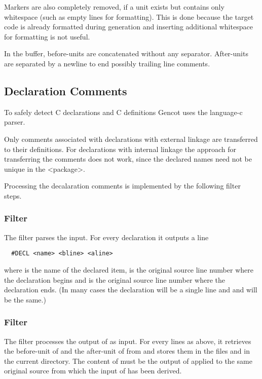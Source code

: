 Markers are also completely removed, if a unit exists but contains only whitespace (such as empty lines for
formatting). This is done because the target code is already formatted during generation and inserting additional
whitespace for formatting is not useful.

In the buffer, before-units are concatenated without any separator. After-units are separated by a newline to end possibly 
trailing line comments.





\subsection{Declaration Comments}

To safely detect C declarations and C definitions Gencot uses the language-c parser. 

Only comments associated with declarations with external linkage are transferred to their definitions. For declarations
with internal linkage the approach for transferring the comments does not work, since the declared names need not be
unique in the <package>.

Processing the decalaration comments is implemented by the following filter steps. 

\subsubsection{Filter }

The filter  parses the input. For every declaration it outputs a line
\begin{verbatim}
  #DECL <name> <bline> <aline>
\end{verbatim}
where  is the name of the declared item,  is the original source line 
number where the declaration begins and  is
the original source line number where the declaration ends. (In many cases the declaration will be
a single line and  and  will be the same.)

\subsubsection{Filter }

The filter  processes the output of  as input. For every
lines as above, it retrieves the before-unit of  and the after-unit of  from 
and stores them in the files  and  in the
current directory. The content of  must be the output of  applied to the same
original source from which the input of  has been derived.

